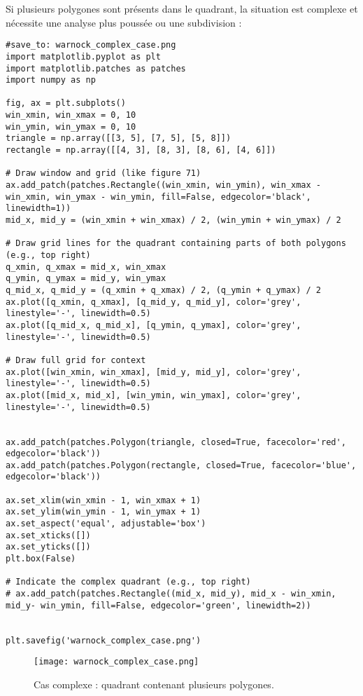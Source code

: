 \documentclass{article}
\begin{document}
Si plusieurs polygones sont présents dans le quadrant, la situation est complexe et nécessite une analyse plus poussée ou une subdivision :

\begin{verbatim}
#save_to: warnock_complex_case.png
import matplotlib.pyplot as plt
import matplotlib.patches as patches
import numpy as np

fig, ax = plt.subplots()
win_xmin, win_xmax = 0, 10
win_ymin, win_ymax = 0, 10
triangle = np.array([[3, 5], [7, 5], [5, 8]])
rectangle = np.array([[4, 3], [8, 3], [8, 6], [4, 6]])

# Draw window and grid (like figure 71)
ax.add_patch(patches.Rectangle((win_xmin, win_ymin), win_xmax - win_xmin, win_ymax - win_ymin, fill=False, edgecolor='black', linewidth=1))
mid_x, mid_y = (win_xmin + win_xmax) / 2, (win_ymin + win_ymax) / 2

# Draw grid lines for the quadrant containing parts of both polygons (e.g., top right)
q_xmin, q_xmax = mid_x, win_xmax
q_ymin, q_ymax = mid_y, win_ymax
q_mid_x, q_mid_y = (q_xmin + q_xmax) / 2, (q_ymin + q_ymax) / 2
ax.plot([q_xmin, q_xmax], [q_mid_y, q_mid_y], color='grey', linestyle='-', linewidth=0.5)
ax.plot([q_mid_x, q_mid_x], [q_ymin, q_ymax], color='grey', linestyle='-', linewidth=0.5)

# Draw full grid for context
ax.plot([win_xmin, win_xmax], [mid_y, mid_y], color='grey', linestyle='-', linewidth=0.5)
ax.plot([mid_x, mid_x], [win_ymin, win_ymax], color='grey', linestyle='-', linewidth=0.5)


ax.add_patch(patches.Polygon(triangle, closed=True, facecolor='red', edgecolor='black'))
ax.add_patch(patches.Polygon(rectangle, closed=True, facecolor='blue', edgecolor='black'))

ax.set_xlim(win_xmin - 1, win_xmax + 1)
ax.set_ylim(win_ymin - 1, win_ymax + 1)
ax.set_aspect('equal', adjustable='box')
ax.set_xticks([])
ax.set_yticks([])
plt.box(False)

# Indicate the complex quadrant (e.g., top right)
# ax.add_patch(patches.Rectangle((mid_x, mid_y), mid_x - win_xmin, mid_y- win_ymin, fill=False, edgecolor='green', linewidth=2))


plt.savefig('warnock_complex_case.png')
\end{verbatim}

\begin{figure}[H]
\centering
\texttt{[image: warnock\_complex\_case.png]}
\caption{Cas complexe : quadrant contenant plusieurs polygones.}
\label{fig:warnock_complex}
\end{figure}
\end{document}
